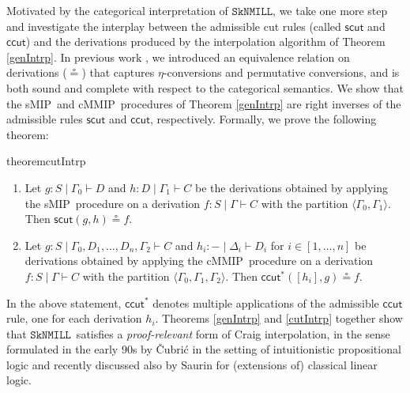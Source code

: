 \documentclass[sn-mathphys-num]{sn-jnl}%
\newcommand{\GG}{\Gamma}
\newcommand{\GD}{\Delta}
\newcommand{\vd}{\vdash}
\newcommand{\bsls}{\backslash}
\newcommand{\SkNMILL}{$\mathtt{SkNMILL}$}
\newcommand{\mf}[1]{\mathsf{#1}}
\newcommand{\sMIP}{\textsf{sMIP}}
\newcommand{\cMMIP}{\textsf{cMMIP}}
\theoremstyle{thmstyleone}%
\theoremstyle{thmstyletwo}%
\theoremstyle{thmstylethree}%
\begin{document}
Motivated by the categorical interpretation of \SkNMILL, we take one more step and investigate the interplay between the admissible cut rules (called $\mf{scut}$ and $\mf{ccut}$) and the derivations produced by the interpolation algorithm of Theorem \ref{genIntrp}.
In previous work \cite{UVW:protsn}, we introduced an equivalence relation on derivations ($\circeq$) that captures $\eta$-conversions and permutative conversions, and is both sound and complete with respect to the categorical semantics.
We show that the \sMIP~and \cMMIP~procedures of Theorem \ref{genIntrp} are right inverses of the admissible rules $\mf{scut}$ and $\mf{ccut}$, respectively. Formally, we prove the following theorem:
\begin{restatable*}{theorem}{cutIntrp}\label{cutIntrp}
  ~
  \begin{enumerate}[label=(\roman*)]
    \item Let $g : S \mid \GG_0 \vd D$ and $h : D \mid \GG_1 \vd C$ be the derivations obtained by applying the \sMIP~procedure on a derivation $f: S \mid \GG \vd C$ with the partition $\langle \GG_0 , \GG_1 \rangle$. Then $\mf{scut}(g, h) \circeq f$.
    \item Let $g : S \mid \GG_0 , D_1 , \dots, D_n, \GG_2 \vd C$ and $h_i : {-} \mid \GD_i \vd D_i$ for $i \in [1,\dots , n]$ be derivations obtained by applying the \cMMIP~procedure on a derivation $f: S \mid \GG \vd C$ with the partition $\langle \GG_0 , \GG_1 , \GG_2 \rangle$. Then $\mf{ccut}^*([h_i] , g) \circeq f$.
  \end{enumerate}
\end{restatable*}

In the above statement, $\mf{ccut}^*$ denotes multiple applications of the admissible $\mf{ccut}$ rule, one for each derivation $h_i$.
Theorems \ref{genIntrp} and \ref{cutIntrp} together show that \SkNMILL\ satisfies a \emph{proof-relevant} form of Craig interpolation, in the sense  formulated in the early 90s by {\v{C}}ubri{\'c} \cite{Cubric1994} in the setting of intuitionistic propositional logic and recently discussed also by Saurin \cite{Saurin2024} for (extensions of) classical linear logic.

\end{document}
